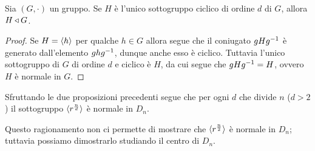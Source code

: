 \begin{corollary}
    Sia $(G, \cdot)$ un gruppo. Se $H$ è l'unico sottogruppo ciclico di ordine $d$ di $G$, allora $H \triangleleft G$.
\end{corollary}
\begin{proof}
    Se $H = \langle h\rangle$ per qualche $h \in G$ allora segue che il coniugato $gHg^{-1}$ è generato dall'elemento $ghg^{-1}$, dunque anche esso è ciclico. Tuttavia l'unico sottogruppo di $G$ di ordine $d$ e ciclico è $H$, da cui segue che $gHg^{-1} = H$, ovvero $H$ è normale in $G$.
\end{proof}

Sfruttando le due proposizioni precedenti segue che per ogni $d$ che divide $n$ ($d > 2$) il sottogruppo $\langle r^{\frac{n}{d}}\rangle$ è normale in $D_n$.

Questo ragionamento non ci permette di mostrare che $\langle r^{\frac{n}2}\rangle$ è normale in $D_n$; tuttavia possiamo dimostrarlo studiando il centro di $D_n$.

